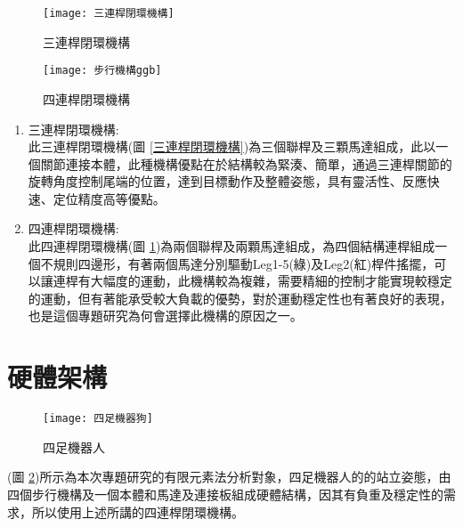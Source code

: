 \begin{figure}[htbp]
  \begin{minipage}[t]{0.5\linewidth}
    \centering
    \texttt{[image: 三連桿閉環機構]}
    \caption{三連桿閉環機構}
    \label{三連桿閉環機構}
  \end{minipage}
  \hfill
  \begin{minipage}[t]{0.4\linewidth}
    \centering
    \texttt{[image: 步行機構ggb]}
    \caption{四連桿閉環機構}
    \label{步行機構ggb}
  \end{minipage}
\end{figure}

\begin{enumerate}
\item 三連桿閉環機構:\\

此三連桿閉環機構(圖 \ref{三連桿閉環機構})為三個聯桿及三顆馬達組成，此以一個關節連接本體，此種機構優點在於結構較為緊湊、簡單，通過三連桿關節的旋轉角度控制尾端的位置，達到目標動作及整體姿態，具有靈活性、反應快速、定位精度高等優點。\

\item 四連桿閉環機構:\\

此四連桿閉環機構(圖 \ref{步行機構ggb})為兩個聯桿及兩顆馬達組成，為四個結構連桿組成一個不規則四邊形，有著兩個馬達分別驅動Leg1-5(綠)及Leg2(紅)桿件搖擺，可以讓連桿有大幅度的運動，此機構較為複雜，需要精細的控制才能實現較穩定的運動，但有著能承受較大負載的優勢，對於運動穩定性也有著良好的表現，也是這個專題研究為何會選擇此機構的原因之一。\\
\end{enumerate}

\section{硬體架構}
\begin{figure}[hbtp]
\begin{center}
\texttt{[image: 四足機器狗]}
\caption{\Large 四足機器人}\label{四足機器狗}
\end{center}
\end{figure}

(圖 \ref{四足機器狗})所示為本次專題研究的有限元素法分析對象，四足機器人的的站立姿態，由四個步行機構及一個本體和馬達及連接板組成硬體結構，因其有負重及穩定性的需求，所以使用上述所講的四連桿閉環機構。\

\newpage

